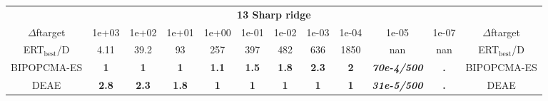 \begin{tabular}{cccccccccccc}
 & \multicolumn{10}{c}{{\normalsize \textbf{13 Sharp ridge}}}\\
$\Delta$ftarget& 1e+03& 1e+02& 1e+01& 1e+00& 1e-01& 1e-02& 1e-03& 1e-04& 1e-05& 1e-07 & $\Delta$ftarget \\
ERT$_{\textrm{best}}$/D& 4.11& 39.2& 93& 257& 397& 482& 636& 1850& nan& nan & ERT$_{\textrm{best}}$/D \\
\hline
BIPOPCMA-ES & \textbf{1} & \textbf{1} & \textbf{1} & \textbf{1.1} & \textbf{1.5} & \textbf{1.8} & \textbf{2.3} & \textbf{2} & \textbf{\textit{70e-4}\textit{/500}} & \textbf{.} & BIPOPCMA-ES \cite{add_an_entry_for_BIPOPCMA-ES_in_bbob.bib}\\
DEAE & \textbf{2.8} & \textbf{2.3} & \textbf{1.8} & \textbf{1} & \textbf{1} & \textbf{1} & \textbf{1} & \textbf{1} & \textbf{\textit{31e-5}\textit{/500}} & \textbf{.} & DEAE \cite{add_an_entry_for_DEAE_in_bbob.bib}
\end{tabular}

